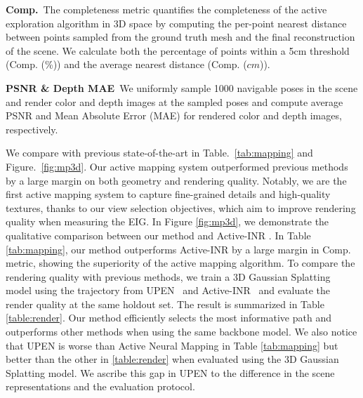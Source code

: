 \noindent\textbf{Comp.}~The completeness metric quantifies the completeness of the active exploration algorithm in 3D space by computing the per-point nearest distance between points sampled from the ground truth mesh and the final reconstruction of the scene. We calculate both the percentage of points within a 5cm threshold (Comp. (\%)) and the average nearest distance (Comp. ($cm$)).

\noindent\textbf{PSNR \& Depth MAE}~We uniformly sample 1000 navigable poses in the scene and render color and depth images at the sampled poses and compute average PSNR and Mean Absolute Error (MAE) for rendered color and depth images, respectively.


We compare with previous state-of-the-art in Table.~\ref{tab:mapping} and Figure.~\ref{fig:mp3d}. 
Our active mapping system outperformed previous methods by a large margin on both geometry and rendering quality.
Notably, we are the first active mapping system to capture fine-grained details and high-quality textures, thanks to our view selection objectives, which aim to improve rendering quality when measuring the EIG. 
In Figure \ref{fig:mp3d}, we demonstrate the qualitative comparison between our method and Active-INR \cite{yan2023active-neural-mapping}. 
In Table \ref{tab:mapping}, our method outperforms Active-INR by a large margin in Comp. metric, showing the superiority of the active mapping algorithm. To compare the rendering quality with previous methods, we train a 3D Gaussian Splatting model using the trajectory from UPEN~\cite{upen} and Active-INR~\cite{yan2023active-neural-mapping} and evaluate the render quality at the same holdout set. The result is summarized in Table \ref{table:render}. Our method efficiently selects the most informative path and outperforms other methods when using the same backbone model. We also notice that UPEN is worse than Active Neural Mapping in Table \ref{tab:mapping} but better than the other in \ref{table:render} when evaluated using the 3D Gaussian Splatting model. We ascribe this gap in UPEN to the difference in the scene representations and the evaluation protocol.
 
